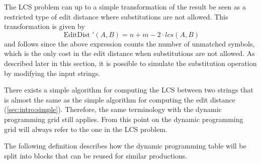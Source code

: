 \documentclass[twoside,11pt,openright]{report}
\newcommand{\EditDist}{\operatorname{EditDist}}
\begin{document}
The LCS problem can up to a simple transformation of the result be seen as a restricted type of edit distance where substitutions are not allowed. This transformation is given by
\[
  \EditDist'(A, B) = n + m - 2 \cdot lcs(A, B)
\]
and follows since the above expression counts the number of unmatched symbols, which is the only cost in the edit distance when substitutions are not allowed. As described later in this section, it is possible to simulate the substitution operation by modifying the input strings.

There exists a simple algorithm for computing the LCS between two strings that is almost the same as the simple algorithm for computing the edit distance (\cref{sec:intro:simple}). Therefore, the same terminology with the dynamic programming grid still applies. From this point on the dynamic programming grid will always refer to the one in the LCS problem.

The following definition describes how the dynamic programming table will be split into blocks that can be reused for similar productions.
\end{document}
